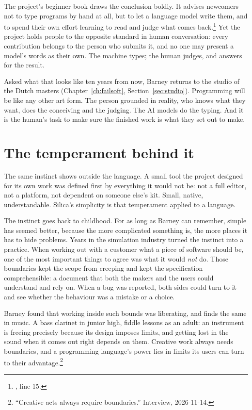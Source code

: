 The project's beginner book draws the conclusion boldly. It advises newcomers
not to type programs by hand at all, but to let a language model write them,
and to spend their own effort learning to read and judge what comes
back.\footnote{, line 15.} Yet the
project holds people to the opposite standard in human conversation: every
contribution belongs to the person who submits it, and no one may present a
model's words as their own. The machine types; the human judges, and answers
for the result.

Asked what that looks like ten years from now, Barney returns to the studio of
the Dutch masters (Chapter~\ref{ch:failsoft}, Section~\ref{sec:studio}).
Programming will be like any other art form. The person grounded in reality, who
knows what they want, does the conceiving and the judging. The AI models do the
typing. And it is the human's task to make sure the finished work is what they
set out to make.

\section{The temperament behind it}

The same instinct shows outside the language. A small tool the project designed
for its own work was defined first by everything it would not be: not a
full editor, not a platform, not dependent on someone else's kit. Small,
native, understandable. Silica's simplicity is that temperament applied to a
language.

The instinct goes back to childhood. For as long as Barney can remember, simple
has seemed better, because the more complicated something is, the more places it
has to hide problems. Years in the simulation industry turned the instinct into a
practice. When working out with a customer what a piece of software should be,
one of the most important things to agree was what it would \emph{not} do. Those
boundaries kept the scope from creeping and kept the specification
comprehensible: a document that both the makers and the users could understand
and rely on. When a bug was reported, both sides could turn to it and see whether
the behaviour was a mistake or a choice.

Barney found that working inside such bounds was liberating, and finds the same
in music. A bass clarinet in junior high, fiddle lessons as an adult: an
instrument is freeing precisely because its design imposes limits, and getting
lost in the sound when it comes out right depends on them. Creative work always
needs boundaries, and a programming language's power lies in limits its users
can turn to their advantage.\footnote{``Creative acts always require
boundaries.'' Interview, 2026-11-14.}

